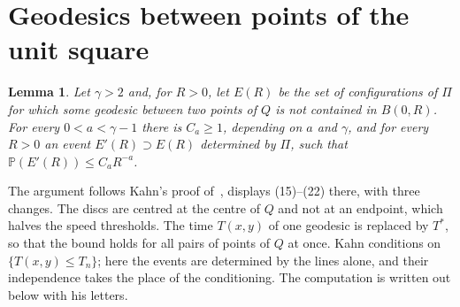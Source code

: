 \documentclass[11pt]{amsart}
\newtheorem{lemma}[theorem]{Lemma}
\theoremstyle{remark}
\newcommand{\Prob}{\mathbb{P}}
\begin{document}
\section{Geodesics between points of the unit square}\label{sec:exit}

\begin{lemma}\label{lem:exit}
Let $\gamma>2$ and, for $R>0$, let $E(R)$ be the set of configurations of $\Pi$ for which some geodesic between two
points of $Q$ is not contained in $B(0,R)$. For every $0<a<\gamma-1$ there is $C_a\ge1$, depending on $a$ and $\gamma$, and for every $R>0$ an event
$E'(R)\supset E(R)$ determined by $\Pi$, such that $\Prob(E'(R))\le C_aR^{-a}$.
\end{lemma}

The argument follows Kahn's proof of~\cite[Theorem~5.1]{Kahn}, displays (15)--(22) there, with three changes.
The discs are centred at the centre of $Q$ and not at an endpoint, which halves the speed thresholds. The time
$T(x,y)$ of one geodesic is replaced by $T^*$, so that the bound holds for all pairs of points of $Q$ at once. Kahn
conditions on $\{T(x,y)\le T_n\}$; here the events are determined by the lines alone, and their independence takes
the place of the conditioning. The computation is written out below with his letters.
\end{document}
